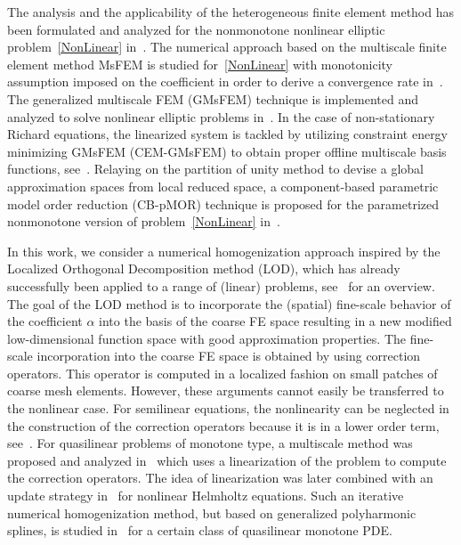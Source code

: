 \documentclass{article}
\begin{document}
The analysis and the applicability of the heterogeneous finite element method has been formulated and analyzed for the nonmonotone nonlinear elliptic problem~\eqref{NonLinear} in~\cite{HMM_quasiliner, HMS-ofNonmonotne}. The numerical approach based on the multiscale finite element method MsFEM is studied for~\eqref{NonLinear} with monotonicity assumption imposed on the coefficient in order to derive a convergence rate in~\cite{MSFEM}. The generalized multiscale FEM (GMsFEM) technique is implemented and analyzed to solve nonlinear elliptic problems in~\cite{NonlinearGMS}. In the case of non-stationary Richard equations, the linearized system is tackled by utilizing constraint energy minimizing GMsFEM (CEM-GMsFEM) to obtain proper offline multiscale basis functions, see~\cite{CEM-GMsFEM}. Relaying on the partition of unity method to devise a global approximation spaces from local reduced space, a component-based parametric model order reduction (CB-pMOR) technique is proposed for the parametrized nonmonotone version of problem~\eqref{NonLinear} in~\cite{CB_pMOR}.
 

In this work, we consider a numerical homogenization approach inspired by the Localized Orthogonal Decomposition method (LOD), which has already successfully been applied to a range of (linear) problems, see~\cite{NumericalHomogenizationActaNumerica,LOD-Linear} for an overview. The goal of the LOD method is to incorporate the (spatial) fine-scale behavior of the coefficient $\alpha$ into the basis of the coarse FE space resulting in a new modified low-dimensional function space with good approximation properties. The fine-scale incorporation into the coarse FE space is obtained by using correction operators. This operator is computed in a localized fashion on small patches of coarse mesh elements. However, these arguments cannot easily be transferred to the nonlinear case. For semilinear equations, the nonlinearity can be neglected in the construction of the correction operators because it is in a lower order term, see~\cite{semilinear}. For quasilinear problems of monotone type, a multiscale method was proposed and analyzed in~\cite{Barbara} which uses a linearization of the problem to compute the correction operators. The idea of linearization was later combined with an update strategy in~\cite{MAir&barbara} for nonlinear Helmholtz equations. Such an iterative numerical homogenization method, but based on generalized polyharmonic splines, is studied in~\cite{IterativeLOD} for a certain class of quasilinear monotone PDE. 
\end{document}
